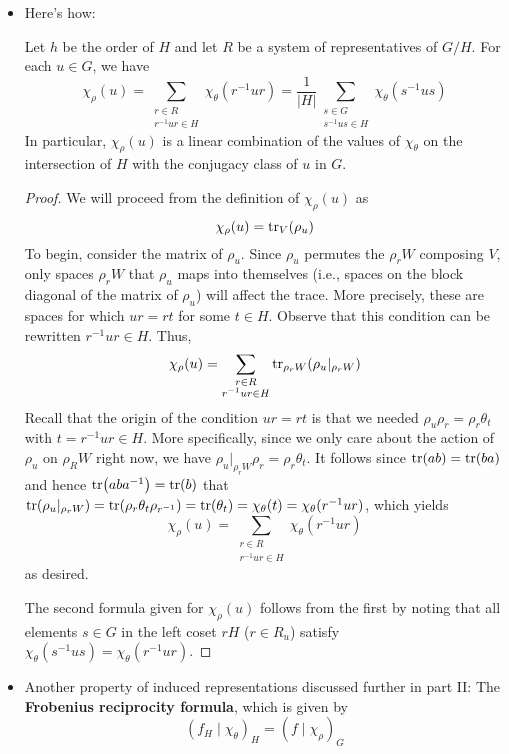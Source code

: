 \documentclass[../notes.tex]{subfiles}
\begin{document}
\begin{itemize}
    \item Here's how:
    \begin{theorem}\label{trm:induceChi}
        Let $h$ be the order of $H$ and let $R$ be a system of representatives of $G/H$. For each $u\in G$, we have
        \begin{equation*}
            \chi_\rho(u) = \sum_{\substack{r\in R\\r^{-1}ur\in H}}\chi_\theta(r^{-1}ur)
            = \frac{1}{|H|}\sum_{\substack{s\in G\\s^{-1}us\in H}}\chi_\theta(s^{-1}us)
        \end{equation*}
        In particular, $\chi_\rho(u)$ is a linear combination of the values of $\chi_\theta$ on the intersection of $H$ with the conjugacy class of $u$ in $G$.
        \begin{proof}
            We will proceed from the definition of $\chi_\rho(u)$ as
            \begin{equation*}
                \chi_\rho(u) = \tr_V(\rho_u)
            \end{equation*}
            To begin, consider the matrix of $\rho_u$. Since $\rho_u$ permutes the $\rho_rW$ composing $V$, only spaces $\rho_rW$ that $\rho_u$ maps into themselves (i.e., spaces on the block diagonal of the matrix of $\rho_u$) will affect the trace. More precisely, these are spaces for which $ur=rt$ for some $t\in H$. Observe that this condition can be rewritten $r^{-1}ur\in H$. Thus,
            \begin{equation*}
                \chi_\rho(u) = \sum_{\substack{r\in R\\r^{-1}ur\in H}}\tr_{\rho_rW}(\rho_u|_{\rho_rW})
            \end{equation*}
            Recall that the origin of the condition $ur=rt$ is that we needed $\rho_u\rho_r=\rho_r\theta_t$ with $t=r^{-1}ur\in H$. More specifically, since we only care about the action of $\rho_u$ on $\rho_RW$ right now, we have $\rho_u|_{\rho_rW}\rho_r=\rho_r\theta_t$. It follows since $\tr(ab)=\tr(ba)$ and hence $\tr(aba^{-1})=\tr(b)$ that $\tr(\rho_u|_{\rho_rW})=\tr(\rho_r\theta_t\rho_{r^{-1}})=\tr(\theta_t)=\chi_\theta(t)=\chi_\theta(r^{-1}ur)$, which yields
            \begin{equation*}
                \chi_\rho(u) = \sum_{\substack{r\in R\\r^{-1}ur\in H}}\chi_\theta(r^{-1}ur)
            \end{equation*}
            as desired.\par
            The second formula given for $\chi_\rho(u)$ follows from the first by noting that all elements $s\in G$ in the left coset $rH$ ($r\in R_u$) satisfy $\chi_\theta(s^{-1}us)=\chi_\theta(r^{-1}ur)$.
        \end{proof}
    \end{theorem}
    \item Another property of induced representations discussed further in part II: The \textbf{Frobenius reciprocity formula}, which is given by
    \begin{equation*}
        (f_H\mid\chi_\theta)_H = (f\mid\chi_\rho)_G
    \end{equation*}
\end{itemize}
\end{document}
